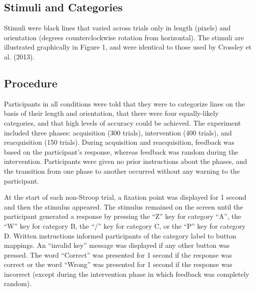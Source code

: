 \documentclass[apacite,draftfirst,jou]{apa6}
\begin{document}
\subsection*{Stimuli and Categories}
Stimuli were black lines that varied across trials only in length (pixels) and
orientation (degrees counterclockwise rotation from horizontal). The stimuli are
illustrated graphically in Figure 1, and were identical to those used by
Crossley et al. (2013).

\subsection{Procedure}
Participants in all conditions were told that they were to categorize lines on
the basis of their length and orientation, that there were four equally-likely
categories, and that high levels of accuracy could be achieved. The experiment
included three phases: acquisition (300 trials), intervention (400 trials), and
reacquisition (150 trials). During acquisition and reacquisition, feedback was
based on the participant's response, whereas feedback was random during the
intervention. Participants were given no prior instructions about the phases,
and the transition from one phase to another occurred without any warning to the
participant.

At the start of each non-Stroop trial, a fixation point was displayed for 1
second and then the stimulus appeared. The stimulus remained on the screen until
the participant generated a response by pressing the ``Z'' key for category
``A'', the ``W'' key for category B, the ``/'' key for category C, or the ``P''
key for category D. Written instructions informed participants of the category
label to button mappings. An ``invalid key'' message was displayed if any other
button was pressed. The word ``Correct'' was presented for 1 second if the
response was correct or the word ``Wrong'' was presented for 1 second if the
response was incorrect (except during the intervention phase in which feedback
was completely random).
\end{document}
